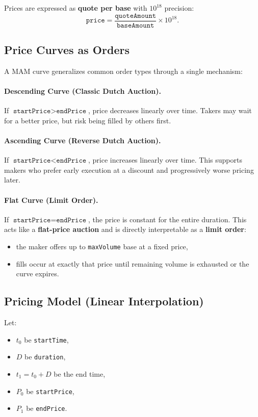 \documentclass[version=preprint]{iacrcc}
\begin{document}
Prices are expressed as \textbf{quote per base} with $10^{18}$ precision:
\[
\texttt{price} = \frac{\texttt{quoteAmount}}{\texttt{baseAmount}} \times 10^{18}.
\]

\subsection{Price Curves as Orders}

A MAM curve generalizes common order types through a single mechanism:

\paragraph{Descending Curve (Classic Dutch Auction).}
If $\texttt{startPrice} > \texttt{endPrice}$, price decreases linearly over time. Takers may wait for a better price, but risk being filled by others first.

\paragraph{Ascending Curve (Reverse Dutch Auction).}
If $\texttt{startPrice} < \texttt{endPrice}$, price increases linearly over time. This supports makers who prefer early execution at a discount and progressively worse pricing later.

\paragraph{Flat Curve (Limit Order).}
If $\texttt{startPrice} = \texttt{endPrice}$, the price is constant for the entire duration. This acts like a \textbf{flat-price auction} and is directly interpretable as a \textbf{limit order}:
\begin{itemize}
  \item the maker offers up to \texttt{maxVolume} base at a fixed price,
  \item fills occur at exactly that price until remaining volume is exhausted or the curve expires.
\end{itemize}

\subsection{Pricing Model (Linear Interpolation)}

Let:
\begin{itemize}
  \item $t_0$ be \texttt{startTime},
  \item $D$ be \texttt{duration},
  \item $t_1 = t_0 + D$ be the end time,
  \item $P_0$ be \texttt{startPrice},
  \item $P_1$ be \texttt{endPrice}.
\end{itemize}
\end{document}
